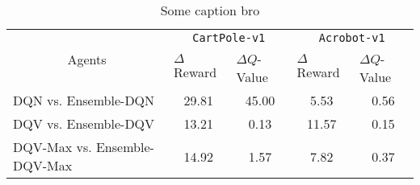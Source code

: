 \documentclass{article}
\begin{document}
\begin{table}
\centering
\setlength{\extrarowheight}{0pt}
\addtolength{\extrarowheight}{\aboverulesep}
\addtolength{\extrarowheight}{\belowrulesep}
\setlength{\aboverulesep}{0pt}
\setlength{\belowrulesep}{0pt}
\caption{Some caption bro}
\label{table:results_diff}
\begin{tabular}{l|cccc}
\toprule
\multicolumn{1}{c|}{\multirow{2}{*}{Agents}} & \multicolumn{2}{c}{\texttt{CartPole-v1}}                                  & \multicolumn{2}{c}{\texttt{Acrobot-v1}}                                      \\
\cmidrule(l){2-5}
\multicolumn{1}{c|}{}                        & \multicolumn{1}{l}{$\Delta$Reward} & \multicolumn{1}{l}{$\Delta Q$-Value} & \multicolumn{1}{l}{$\Delta$Reward}   & \multicolumn{1}{l}{$\Delta Q$-Value}  \\
\midrule
DQN vs. Ensemble-DQN                         & 29.81                              & {\cellcolor[rgb]{1,0.988,0.62}}45.00 & {\cellcolor[rgb]{1,0.988,0.62}}5.53  & {\cellcolor[rgb]{1,0.988,0.62}}0.56   \\
\midrule
DQV vs. Ensemble-DQV                         & 13.21                              & 0.13                                 & {\cellcolor[rgb]{1,0.988,0.62}}11.57 & {\cellcolor[rgb]{1,0.988,0.62}}0.15   \\
\midrule
DQV-Max vs. Ensemble-DQV-Max                 & 14.92                              & 1.57                                 & {\cellcolor[rgb]{1,0.988,0.62}}7.82  & {\cellcolor[rgb]{1,0.988,0.62}}0.37   \\
\bottomrule
\end{tabular}
\end{table}
\end{document}
